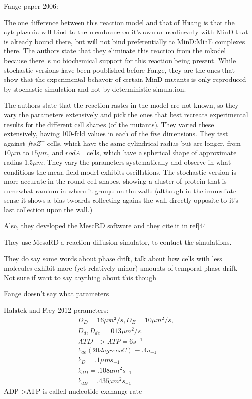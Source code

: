 Fange paper 2006:

The one difference between this reaction model and that of Huang is
that the cytoplasmic will bind to the membrane on it's own or
nonlinearly with MinD that is already bound there, but will not bind
preferentially to MinD:MinE complexes there.  The authors state that
they eliminate this reaction from the mkodel because there is no
biochemical support for this reaction being present.  While stochastic
versions have been poublished before Fange, they are the ones that
show that the experimental behavoir of certain MinD mutants is only
reproduced by stochastic simulation and not by deterministic
simulation.

The authors state that the reaction rastes in the model are not known,
so they vary the parameters extensively and pick the ones that best
recreate experimental results for the different cell shapes (of the
mutants).  They varied these extensively, having 100-fold values in
each of the five dimensions.  They test against $ftsZ^{-}$ cells,
which have the same cylindrical radius but are longer, from $10\mu m$
to $15\mu m$, and $rodA^{-}$ cells, which have a spherical shape of
approximate radius $1.5\mu m$.  They vary the parameters
systematically and observe in what conditions the mean field model
exhibits oscillations.  The stochastic version is more accurate in the
round cell shapes, showing a cluster of protein that is somewhat
random in where it groups on the walls (although in the immediate
sense it shows a bias twoards collecting agains the wall directly
opposite to it's last collection upon the wall.)

Also, they developed the MesoRD software and they cite it in ref[44]

They use MesoRD a reaction diffusion simulator, to contuct the
simulations.

They do say some words about phase drift, talk about how cells with
less molecules exhibit more (yet relatively minor) amounts of temporal
phase drift.  Not sure if want to say anything about this though.

Fange doesn't say what parameters

Halatek and Frey 2012 perameters:
\begin{align}
  D_{D}  = 16\mu m^2/s,   D_{E}  = 10\mu m^2/s,\\
  D_{d}, D_{de}  = .013\mu m^2/s,\\
  ATD->ATP = 6s^{-1}\\
  k_{de}(20degreesC) = .4s_{-1}\\
  k_{D} = .1\mu m s_{-1}\\
  k_{dD} = .108\mu m^2 s_{-1}\\
  k_{dE} = .435\mu m^2 s_{-1}
\end{align}
ADP->ATP is called nucleotide exchange rate
